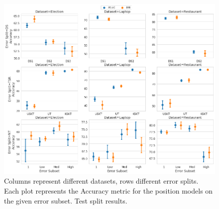 \begin{figure}[h!]
    \centering
    \includegraphics[scale=0.32]{images/augmentation/methods_performance/Position_Encoding/position_split_overall_test_results.png}
    \caption{Columns represent different datasets, rows different error splits. Each plot represents the Accuracy metric for the position models on the given error subset. Test split results.}
    \label{fig:aug_position_split_overall_test_results}
\end{figure}